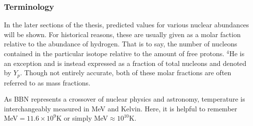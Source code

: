 \subsubsection{Terminology}

In the later sections of the thesis, predicted values for various nuclear abundances will be shown. For historical reasons, these are usually given as a molar faction relative to the abundance of hydrogen. That is to say, the number of nucleons contained in the particular isotope relative to the amount of free protons. ${}^4$He is an exception and is instead expressed as a fraction of total nucleons and denoted by $Y_p$. Though not entirely accurate, both of these molar fractions are often referred to as mass fractions. 

As BBN represents a crossover of nuclear physics and astronomy, temperature is interchangeably measured in MeV and Kelvin. Here, it is helpful to remember MeV$=11.6\times10^9 $K or simply MeV$\approx 10^{10}$K.


